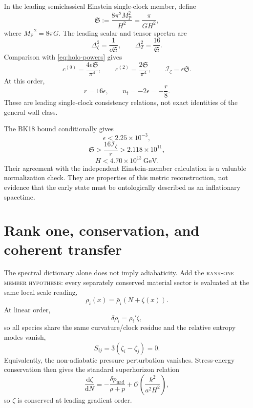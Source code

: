 \documentclass[11pt]{article}
\numberwithin{equation}{section}
\newcommand{\dd}{\mathrm d}
\newcommand{\Iz}{\mathcal I_\zeta}
\newcommand{\cz}{c^{(0)}}
\newcommand{\ct}{c^{(2)}}
\newcommand{\Sfrak}{\mathfrak S}
\newcommand{\Order}{\mathcal O}
\newcommand{\status}[1]{\textsc{\footnotesize #1}}
\theoremstyle{definition}
\theoremstyle{remark}
\begin{document}
In the leading semiclassical Einstein single-clock member, define
\begin{equation}
\Sfrak:=\frac{8\pi^2M_{\mathrm P}^2}{H^2}
=\frac{\pi}{GH^2},
\end{equation}
where $M_{\mathrm P}^{-2}=8\pi G$. The leading scalar and tensor spectra are
\begin{equation}
\Delta_\zeta^2=\frac{1}{\epsilon\Sfrak},
\qquad
\Delta_T^2=\frac{16}{\Sfrak}.
\end{equation}
Comparison with \cref{eq:holo-powers} gives
\begin{equation}
\boxed{
\cz=\frac{4\epsilon\Sfrak}{\pi^4},
\qquad
\ct=\frac{2\Sfrak}{\pi^4},
\qquad
\Iz=\epsilon\Sfrak.}
\label{eq:Einstein-member}
\end{equation}
At this order,
\begin{equation}
r=16\epsilon,
\qquad
n_t=-2\epsilon=-\frac r8.
\end{equation}
These are leading single-clock consistency relations, not exact identities of the general wall class.

The BK18 bound conditionally gives
\begin{equation}
\epsilon<2.25\times10^{-3},
\end{equation}
\begin{equation}
\Sfrak>\frac{16\Iz}{r}>2.118\times10^{11},
\end{equation}
\begin{equation}
H<4.70\times10^{13}\ \mathrm{GeV}.
\end{equation}
Their agreement with the independent Einstein-member calculation is a valuable normalization check. They are properties of this metric reconstruction, not evidence that the early state must be ontologically described as an inflationary spacetime.

\section{Rank one, conservation, and coherent transfer}
\label{sec:transfer}

The spectral dictionary alone does not imply adiabaticity. Add the \status{rank-one member hypothesis}: every separately conserved material sector is evaluated at the same local scale reading,
\begin{equation}
\rho_i(x)=\bar\rho_i(N+\zeta(x)).
\end{equation}
At linear order,
\begin{equation}
\delta\rho_i=\bar\rho_i'\zeta,
\end{equation}
so all species share the same curvature/clock residue and the relative entropy modes vanish,
\begin{equation}
\boxed{S_{ij}=3(\zeta_i-\zeta_j)=0.}
\end{equation}
Equivalently, the non-adiabatic pressure perturbation vanishes. Stress-energy conservation then gives the standard superhorizon relation
\begin{equation}
\frac{\dd\zeta}{\dd N}
=-\frac{\delta p_{\mathrm{nad}}}{\rho+p}
+\Order\!\left(\frac{k^2}{a^2H^2}\right),
\end{equation}
so $\zeta$ is conserved at leading gradient order.
\end{document}
